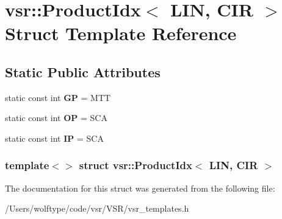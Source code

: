 \hypertarget{structvsr_1_1_product_idx_3_01_l_i_n_00_01_c_i_r_01_4}{\section{vsr\-:\-:Product\-Idx$<$ L\-I\-N, C\-I\-R $>$ Struct Template Reference}
\label{structvsr_1_1_product_idx_3_01_l_i_n_00_01_c_i_r_01_4}
}
\subsection*{Static Public Attributes}
\begin{DoxyCompactItemize}
\item 
\hypertarget{structvsr_1_1_product_idx_3_01_l_i_n_00_01_c_i_r_01_4_a9adc6136206ee3ac596675cedc3048e5}{static const int {\bfseries G\-P} = M\-T\-T}\label{structvsr_1_1_product_idx_3_01_l_i_n_00_01_c_i_r_01_4_a9adc6136206ee3ac596675cedc3048e5}

\item 
\hypertarget{structvsr_1_1_product_idx_3_01_l_i_n_00_01_c_i_r_01_4_a92cc715571adb71ec4a0b843f3acb65a}{static const int {\bfseries O\-P} = S\-C\-A}\label{structvsr_1_1_product_idx_3_01_l_i_n_00_01_c_i_r_01_4_a92cc715571adb71ec4a0b843f3acb65a}

\item 
\hypertarget{structvsr_1_1_product_idx_3_01_l_i_n_00_01_c_i_r_01_4_a8f3ec4c3f81b9d437896ff0da9bc8cda}{static const int {\bfseries I\-P} = S\-C\-A}\label{structvsr_1_1_product_idx_3_01_l_i_n_00_01_c_i_r_01_4_a8f3ec4c3f81b9d437896ff0da9bc8cda}

\end{DoxyCompactItemize}
\subsubsection*{template$<$$>$ struct vsr\-::\-Product\-Idx$<$ L\-I\-N, C\-I\-R $>$}



The documentation for this struct was generated from the following file\-:\begin{DoxyCompactItemize}
\item 
/\-Users/wolftype/code/vsr/\-V\-S\-R/vsr\-\_\-templates.\-h\end{DoxyCompactItemize}

